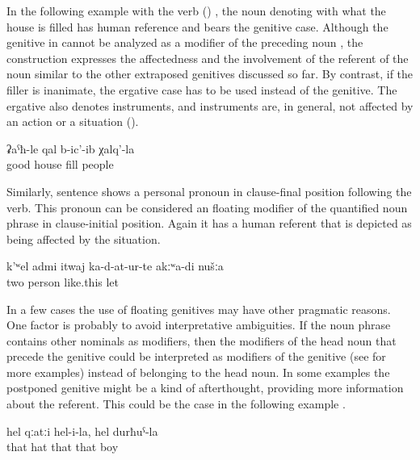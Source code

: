 In the following example  with the verb  () , the noun denoting with what the house is filled has human reference and bears the genitive case. Although the genitive in  cannot be analyzed as a modifier of the preceding noun  , the construction expresses the affectedness and the involvement of the referent of the noun   similar to the other extraposed genitives discussed so far. By contrast, if the filler is inanimate, the ergative case has to be used instead of the genitive. The ergative also denotes instruments, and instruments are, in general, not affected by an action or a situation ().
%
\begin{exe}
	\ex	\label{ex:the house filled well with people}
	\gll	ʡaˁħ-le	qal	b-ic'-ib	χalq'-la\\
		good	house	fill	people\\
	\glt	{}
\end{exe}

Similarly, sentence  shows a personal pronoun in clause-final position following the verb. This pronoun can be considered an floating modifier of the quantified noun phrase   in clause-initial position. Again it has a human referent that is depicted as being affected by the situation.
%
\begin{exe}
	\ex	\label{ex:‎‎‎(She) did not put the two of us like this}
	\gll	k'ʷel admi	itwaj	ka-d-at-ur-te	akːʷa-di	nušːa\\
		two	person	like.this	let 		\\
	\glt	{}
\end{exe}

In a few cases the use of floating genitives may have other pragmatic reasons. One factor is probably to avoid interpretative ambiguities. If the noun phrase contains other nominals as modifiers, then the modifiers of the head noun that precede the genitive could be interpreted as modifiers of the genitive (see  for more examples) instead of belonging to the head noun. In some examples the postponed genitive might be a kind of afterthought, providing more information about the referent. This could be the case in the following example .
%
\begin{exe}
	\ex	\label{ex:the hat of him, of the boy}
	\gll	hel	qːatːi	hel-i-la,	hel	durħuˁ-la\\
		that	hat	that	that	boy\\
	\glt	{}
\end{exe}

